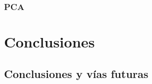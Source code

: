 \documentclass[ oneside,openany,titlepage,numbers=noenddot,headinclude,%
                footinclude=true,cleardoublepage=empty,abstractoff, %
                BCOR=5mm,paper=a4,fontsize=11pt,%
                spanish,american%
                ]{scrreprt}
\begin{document}
\section{PCA}



\part{Conclusiones}

\chapter{Conclusiones y vías futuras}\label{ch:conclusions}


\appendix
\cleardoublepage
%
%
\end{document}
